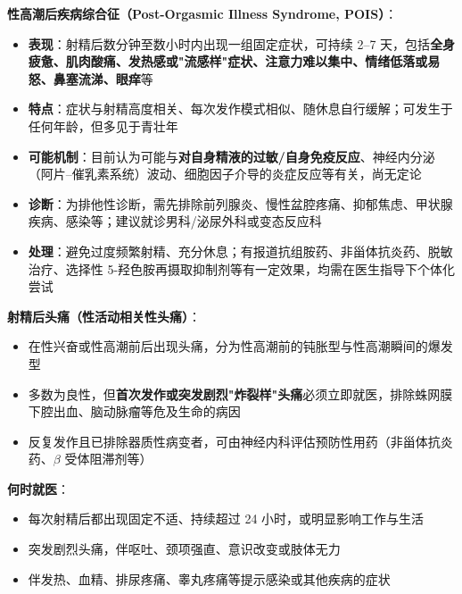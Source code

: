 \vspace{0.5em}
\noindent\textbf{性高潮后疾病综合征（Post-Orgasmic Illness Syndrome, POIS）}：

\begin{itemize}[leftmargin=2cm]
	\item \textbf{表现}：射精后数分钟至数小时内出现一组固定症状，可持续 2--7 天，包括\textbf{全身疲惫、肌肉酸痛、发热感或"流感样"症状、注意力难以集中、情绪低落或易怒、鼻塞流涕、眼痒}等
	\item \textbf{特点}：症状与射精高度相关、每次发作模式相似、随休息自行缓解；可发生于任何年龄，但多见于青壮年
	\item \textbf{可能机制}：目前认为可能与\textbf{对自身精液的过敏/自身免疫反应}、神经内分泌（阿片--催乳素系统）波动、细胞因子介导的炎症反应等有关，尚无定论
	\item \textbf{诊断}：为排他性诊断，需先排除前列腺炎、慢性盆腔疼痛、抑郁焦虑、甲状腺疾病、感染等；建议就诊男科/泌尿外科或变态反应科
	\item \textbf{处理}：避免过度频繁射精、充分休息；有报道抗组胺药、非甾体抗炎药、脱敏治疗、选择性 5-羟色胺再摄取抑制剂等有一定效果，均需在医生指导下个体化尝试
\end{itemize}

\vspace{0.5em}
\noindent\textbf{射精后头痛（性活动相关性头痛）}：

\begin{itemize}[leftmargin=2cm]
	\item 在性兴奋或性高潮前后出现头痛，分为性高潮前的钝胀型与性高潮瞬间的爆发型
	\item 多数为良性，但\textbf{首次发作或突发剧烈"炸裂样"头痛}必须立即就医，排除蛛网膜下腔出血、脑动脉瘤等危及生命的病因
	\item 反复发作且已排除器质性病变者，可由神经内科评估预防性用药（非甾体抗炎药、$\beta$ 受体阻滞剂等）
\end{itemize}

\vspace{0.5em}
\noindent\textbf{何时就医}：

\begin{itemize}[leftmargin=2cm]
	\item 每次射精后都出现固定不适、持续超过 24 小时，或明显影响工作与生活
	\item 突发剧烈头痛，伴呕吐、颈项强直、意识改变或肢体无力
	\item 伴发热、血精、排尿疼痛、睾丸疼痛等提示感染或其他疾病的症状
\end{itemize}

